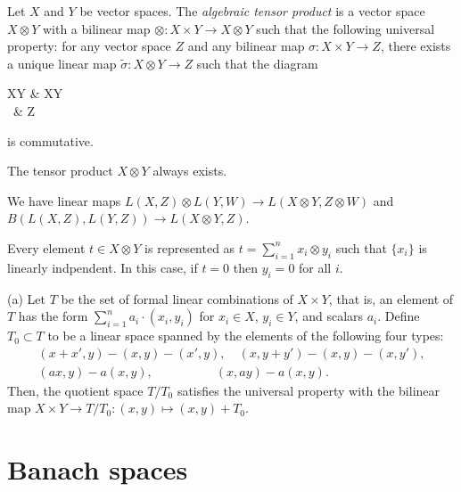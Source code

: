 \documentclass{../../small}
\begin{document}
\begin{prb}
Let $X$ and $Y$ be vector spaces.
The \emph{algebraic tensor product} is a vector space $X\otimes Y$ with a bilinear map $\otimes:X\times Y\to X\otimes Y$ such that the following universal property: for any vector space $Z$ and any bilinear map $\sigma:X\times Y\to Z$, there exists a unique linear map $\tilde\sigma:X\otimes Y\to Z$ such that the diagram
\begin{cd}
X\times Y  & X\otimes Y \\
\, & Z 
\end{cd}
is commutative.
\begin{parts}
\item The tensor product $X\otimes Y$ always exists.
\item We have linear maps $L(X,Z)\otimes L(Y,W)\to L(X\otimes Y,Z\otimes W)$ and $B(L(X,Z),L(Y,Z))\to L(X\otimes Y,Z)$.
\item Every element $t\in X\otimes Y$ is represented as $t=\sum_{i=1}^nx_i\otimes y_i$ such that $\{x_i\}$ is linearly indpendent. In this case, if $t=0$ then $y_i=0$ for all $i$.
\end{parts}
\end{prb}
\begin{pf}
(a)
Let $T$ be the set of formal linear combinations of $X\times Y$, that is, an element of $T$ has the form $\sum_{i=1}^na_i\cdot(x_i,y_i)$ for $x_i\in X$, $y_i\in Y$, and scalars $a_i$.
Define $T_0\subset T$ to be a linear space spanned by the elements of the following four types:
\begin{gather*}
(x+x',y)-(x,y)-(x',y),\quad (x,y+y')-(x,y)-(x,y'),\\
(ax,y)-a(x,y), \quad\qquad\qquad (x,ay)-a(x,y).
\end{gather*}
Then, the quotient space $T/T_0$ satisfies the universal property with the bilinear map $X\times Y\to T/T_0:(x,y)\mapsto(x,y)+T_0$.
\end{pf}

\begin{prb}

\end{prb}



\section{Banach spaces}
\end{document}
